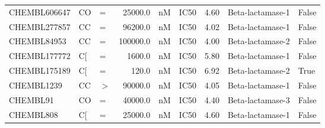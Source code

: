 \begin{tabular}{lllrllrll}
\toprule
CHEMBL606647 &  CO & = &  25000.0 & nM & IC50 & 4.60 & Beta-lactamase-1  & False \\
CHEMBL277857 &  CC & = &  96200.0 & nM & IC50 & 4.02 & Beta-lactamase-1  & False \\
 CHEMBL84953 &  CC & = & 100000.0 & nM & IC50 & 4.00 & Beta-lactamase-2  & False \\
CHEMBL177772 &  C[ & = &   1600.0 & nM & IC50 & 5.80 & Beta-lactamase-1  & False \\
CHEMBL175189 &  C[ & = &    120.0 & nM & IC50 & 6.92 & Beta-lactamase-2  &  True \\
  CHEMBL1239 & CC & $>$ &  90000.0 & nM & IC50 & 4.05 & Beta-lactamase-1  & False \\
    CHEMBL91 & CO & = &  40000.0 & nM & IC50 & 4.40 & Beta-lactamase-3  & False \\
   CHEMBL808 & C[ & = &  25000.0 & nM & IC50 & 4.60 & Beta-lactamase-1 & False \\
\bottomrule
\end{tabular}
